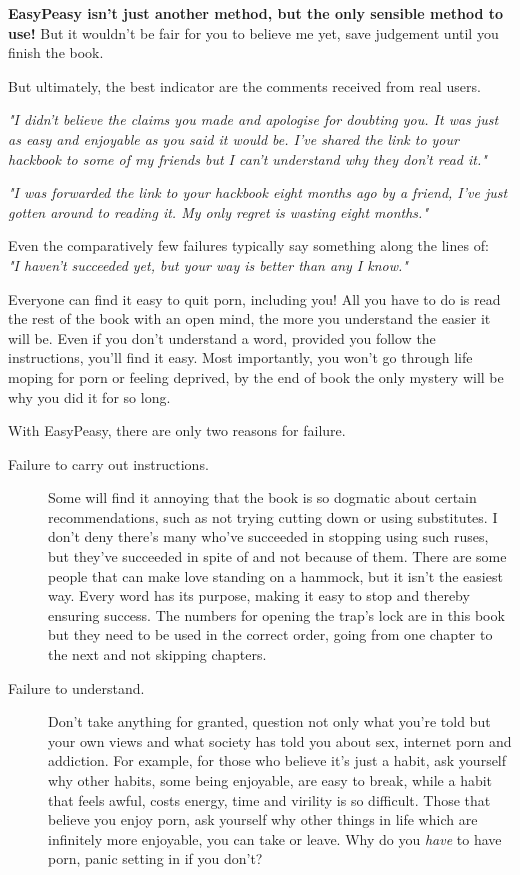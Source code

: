 \documentclass[easypeasy.tex]{subfiles}
\begin{document}
\textbf{EasyPeasy isn't just another method, but the only sensible method to use!} But it wouldn't be fair for you to believe me yet, save judgement until you finish the book.

But ultimately, the best indicator are the comments received from real users.

\textit{"I didn't believe the claims you made and apologise for doubting you. It was just as easy and enjoyable as you said it would be. I've shared the link to your hackbook to some of my friends but I can't understand why they don't read it."}

\textit{"I was forwarded the link to your hackbook eight months ago by a friend, I've just gotten around to reading it. My only regret is wasting eight months."}

Even the comparatively few failures typically say something along the lines of: \\ \textit{"I haven't succeeded yet, but your way is better than any I know."}

Everyone can find it easy to quit porn, including you! All you have to do is read the rest of the book with an open mind, the more you understand the easier it will be. Even if you don't understand a word, provided you follow the instructions, you'll find it easy. Most importantly, you won't go through life moping for porn or feeling deprived, by the end of book the only mystery will be why you did it for so long.

With EasyPeasy, there are only two reasons for failure.

\begin{description}
  \item [Failure to carry out instructions.] Some will find it annoying that the book is so dogmatic about certain recommendations, such as not trying cutting down or using substitutes. I don't deny there's many who've succeeded in stopping using such ruses, but they've succeeded in spite of and not because of them. There are some people that can make love standing on a hammock, but it isn't the easiest way. Every word has its purpose, making it easy to stop and thereby ensuring success. The numbers for opening the trap's lock are in this book but they need to be used in the correct order, going from one chapter to the next and not skipping chapters.

  \item [Failure to understand.] Don't take anything for granted, question not only what you're told but your own views and what society has told you about sex, internet porn and addiction. For example, for those who believe it's just a habit, ask yourself why other habits, some being enjoyable, are easy to break, while a habit that feels awful, costs energy, time and virility is so difficult. Those that believe you enjoy porn, ask yourself why other things in life which are infinitely more enjoyable, you can take or leave. Why do you \textit{have} to have porn, panic setting in if you don't?
\end{description}
\end{document}
